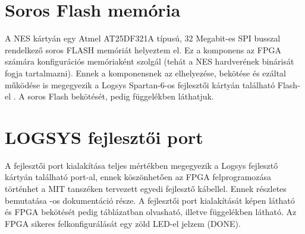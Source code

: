 \section{Soros Flash memória}
	
	A NES kártyán egy Atmel AT25DF321A típusú, 32 Megabit-es SPI busszal rendelkező soros FLASH memóriát helyeztem el. Ez a komponens az FPGA számára konfigurációs memóriaként szolgál (tehát a NES hardverének binárisát fogja tartalmazni). Ennek a komponensnek az elhelyezése, bekötése és ezáltal működése is megegyezik a Logsys Spartan-6-os fejlesztői kártyán található Flash-el \cite{spatan6}. A soros Flash bekötését, pedig  függelékben láthatjuk.
	
\section{LOGSYS fejlesztői port}
	
	A fejlesztői port kialakítása teljes mértékben megegyezik a Logsys fejlesztő kártyán található port-al, ennek köszönhetően az FPGA felprogramozása történhet a MIT tanszéken tervezett egyedi fejlesztő kábellel. Ennek részletes bemutatása -os dokumentáció része. A fejlesztői port kialakítását  képen látható és FPGA bekötését pedig  táblázatban olvasható, illetve  függelékben látható. Az FPGA sikeres felkonfigurálását egy zöld LED-el jelzem (DONE). %
	
